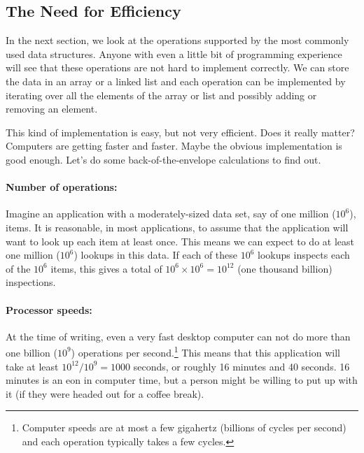 \subsection{The Need for Efficiency}

In the next section, we look at the operations supported by the most
commonly used data structures.  Anyone with even a little bit of
programming experience will see that these operations are not hard to
implement correctly.  We can store the data in an array or a linked list
and each operation can be implemented by iterating over all the elements
of the array or list and possibly adding or removing an element.

This kind of implementation is easy, but not very efficient.  Does it
really matter?  Computers are getting faster and faster. Maybe the
obvious implementation is good enough. Let's do some back-of-the-envelope
calculations to find out.

\paragraph{Number of operations:}  Imagine an application with a
moderately-sized data set, say of one million ($10^6$), items.  It is
reasonable, in most applications, to assume that the application will
want to look up each item at least once.  This means we can expect to do
at least one million ($10^6$) lookups in this data.  If each of these
$10^6$ lookups inspects  each of the $10^6$ items, this gives a total
of $10^6\times 10^6=10^{12}$ (one thousand billion) inspections.

\paragraph{Processor speeds:} At the time of writing, even a very fast
desktop computer can not do more than one billion ($10^9$) operations per
second.\footnote{Computer speeds are at most a few gigahertz (billions
of cycles per second) and each operation typically takes a few cycles.}
This means that this application will take at least $10^{12}/10^9 =
1000$ seconds, or roughly 16 minutes and 40 seconds.  16 minutes is an
eon in computer time, but a person might be willing to put up with it
(if they were headed out for a coffee break).


